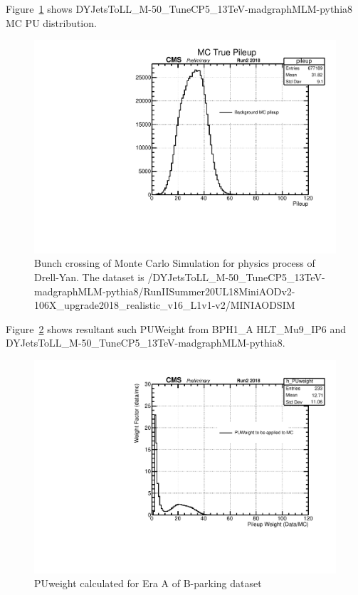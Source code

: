 Figure~\ref{fig:MCPU} shows DYJetsToLL\_M-50\_TuneCP5\_13TeV-madgraphMLM-pythia8 MC PU distribution.
\begin{figure}[h!]
	\caption{Bunch crossing of Monte Carlo Simulation for physics process of Drell-Yan. The dataset is /DYJetsToLL\_M-50\_TuneCP5\_13TeV-madgraphMLM-pythia8/RunIISummer20UL18MiniAODv2-106X\_upgrade2018\_realistic\_v16\_L1v1-v2/MINIAODSIM}
  \label{fig:MCPU}
  \centering
  \includegraphics[width=0.67\linewidth]{figs/NVtx_DYJetsToLL_M-50_try.pdf}

\end{figure}

Figure~\ref{fig:PUWeight9} shows resultant such PUWeight from BPH1\_A HLT\_Mu9\_IP6 and DYJetsToLL\_M-50\_TuneCP5\_13TeV-madgraphMLM-pythia8.
\begin{figure}[h!]
  \caption{PUweight calculated for Era A of B-parking dataset}
  \label{fig:PUWeight9}
  \centering
  \includegraphics[width=0.67\linewidth]{figs/NVtx_PUWeight.pdf}

\end{figure}
